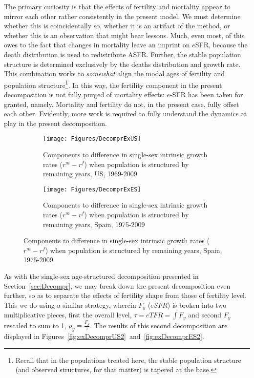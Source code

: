The primary curiosity is that the effects of fertility and mortality appear to
mirror each other rather consistently in the present model. We must determine
whether this is coincidentally so, whether it is an artifact of the method, or
whether this is an observation that might bear lessons. Much, even most, of this
owes to the fact that changes in mortality leave an imprint on $e$SFR, because
the death distribution is used to redistribute ASFR. Further, the stable
population structure is determined exclusively by the deaths distribution and
growth rate. This combination works to \textit{somewhat} align the modal ages of
fertility and population structure\footnote{Recall that in the populations
treated here, the stable population structure (and observed structures, for
that matter) is tapered at the base.}. In this way, the fertility component in
the present decomposition is not fully purged of mortality effects: $e$-SFR has
been taken for granted, namely. Mortality and fertility do not, in the present
case, fully offset each other. Evidently, more work is required to fully
understand the dynamics at play in the present decomposition.

\begin{figure}
        \centering
        \begin{subfigure}
                \centering
                \caption{Components to difference in single-sex intrinsic growth
                rates ($r^m - r^f$) when population is structured by remaining
                years, US, 1969-2009}
                \texttt{[image: Figures/DecomprExUS]}
                \label{fig:exDecomprUS}
        \end{subfigure}
        \begin{subfigure}
                \centering
                \caption{Components to difference in single-sex intrinsic growth
                rates ($r^m - r^f$) when population is structured by remaining
                years, Spain, 1975-2009}
                \texttt{[image: Figures/DecomprExES]}
                \label{fig:exDecomprES}
        \end{subfigure}
\end{figure}
 \FloatBarrier
As with the single-sex age-structured decomposition presented in
Section~\ref{sec:Decompr}, we may break down the present decomposition even
further, so as to separate the effects of fertility shape from those of
fertility level. This we do using a similar strategy, wherein $F_y$ ($eSFR$) is
broken into two multiplicative pieces, first the overall level, $\tau = eTFR =
\int F_y$ and second $F_y$ rescaled to sum to 1, $\rho_y = \frac{F_y}{\tau}$.
The results of this second decomposition are displayed in
Figures~\ref{fig:exDecomprUS2}~and~\ref{fig:exDecomprES2}.

